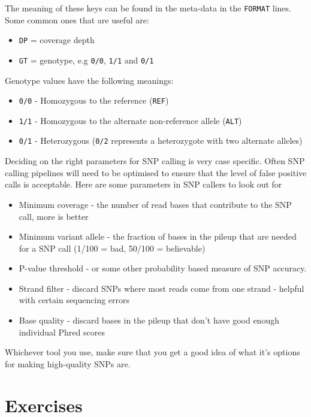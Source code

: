 \documentclass[12pt,]{book}
\providecommand{\tightlist}{%
  \setlength{\itemsep}{0pt}\setlength{\parskip}{0pt}}
\theoremstyle{definition}
\theoremstyle{definition}
\theoremstyle{remark}
\begin{document}
The meaning of these keys can be found in the meta-data in the
\texttt{FORMAT} lines. Some common ones that are useful are:

\begin{itemize}
\tightlist
\item
  \texttt{DP} = coverage depth
\item
  \texttt{GT} = genotype, e.g \texttt{0/0}, \texttt{1/1} and
  \texttt{0/1}
\end{itemize}

Genotype values have the following meanings:

\begin{itemize}
\tightlist
\item
  \texttt{0/0} - Homozygous to the reference (\texttt{REF})
\item
  \texttt{1/1} - Homozygous to the alternate non-reference allele
  (\texttt{ALT})
\item
  \texttt{0/1} - Heterozygous (\texttt{0/2} represents a heterozygote
  with two alternate alleles)
\end{itemize}

Deciding on the right parameters for SNP calling is very case specific.
Often SNP calling pipelines will need to be optimised to ensure that the
level of false positive calls is acceptable. Here are some parameters in
SNP callers to look out for

\begin{itemize}
\tightlist
\item
  Minimum coverage - the number of read bases that contribute to the SNP
  call, more is better
\item
  Minimum variant allele - the fraction of bases in the pileup that are
  needed for a SNP call (1/100 = bad, 50/100 = believable)
\item
  P-value threshold - or some other probability based measure of SNP
  accuracy.
\item
  Strand filter - discard SNPs where most reads come from one strand -
  helpful with certain sequencing errors
\item
  Base quality - discard bases in the pileup that don't have good enough
  individual Phred scores
\end{itemize}

Whichever tool you use, make sure that you get a good idea of what it's
options for making high-quality SNPs are.

\section{Exercises}\label{exercises-2}
\end{document}
